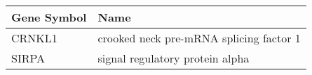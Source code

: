 \begin{tabular}{ll}
\toprule
Gene Symbol &                                    Name \\
\midrule
     CRNKL1 & crooked neck pre-mRNA splicing factor 1 \\
      SIRPA &         signal regulatory protein alpha \\
\bottomrule
\end{tabular}

